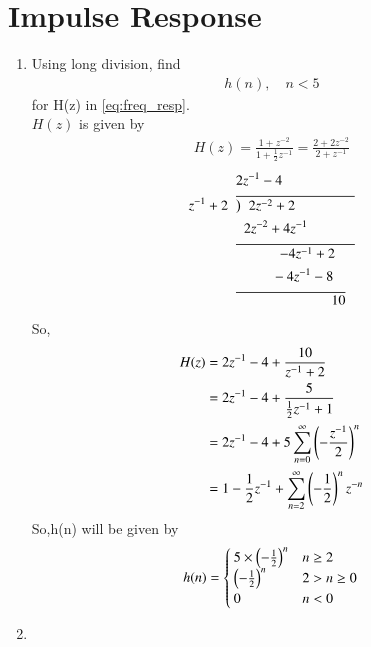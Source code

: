 \documentclass[journal,12pt,twocolumn]{IEEEtran}
\renewcommand\thesection{\arabic{section}}
\begin{document}
\section{Impulse Response}
\begin{enumerate}[label=\thesection.\arabic*]
	\item Using long division, 
	find
	\begin{align}
		h(n), \quad n < 5
	\end{align}
	for H(z) in 
	\eqref{eq:freq_resp}.\\
	\solution $H(z)$ is given by
	\begin{align}
		H(z)=\frac{1+z^{-2}}{1+\frac{1}{2}z^{-1}}=\frac{2+2z^{-2}}{2+z^{-1}}
	\end{align}
	\begin{align}
		&2z^{-1}-4\\	
		z^{-1}+2\hspace{2mm}&\overline{\big)\hspace{2mm} 2z^{-2}+2\hspace{15mm}}\\
		& \hspace{2mm} 2z^{-2}+4z^{-1}\\
		&\overline{\hspace{11mm}-4z^{-1}+2\hspace{5mm}}\\
		&\hspace{9mm}-4z^{-1}-8\\ 
		&\overline{\hspace{24mm}10}
	\end{align}
	So,
	\begin{align}
		H(z)&=2z^{-1}-4+\frac{10}{z^{-1}+2}\\
		&=2z^{-1}-4+\frac{5}{\frac{1}{2}z^{-1}+1}\\
		&=2z^{-1}-4+5\sum_{n=0}^\infty \left(-\frac{z^{-1}}{2}\right)^{n}\\
		&=1-\frac{1}{2}z^{-1}+\sum_{n=2}^\infty \left(-\frac{1}{2}\right)^{n}z^{-n}
	\end{align}
	So,h(n) will be given by 
	\begin{align}
		h(n)=\begin{cases}
			\label{eq:h_n_def}
			5\times \left(-\frac{1}{2}\right)^n  & n\geq 2\\
			\left(-\frac{1}{2}\right)^n  &2>n\geq0\\
			0 &n<0
		\end{cases}
	\end{align}
	\item \label{prob:impulse_resp}

\end{enumerate}
\end{document}
